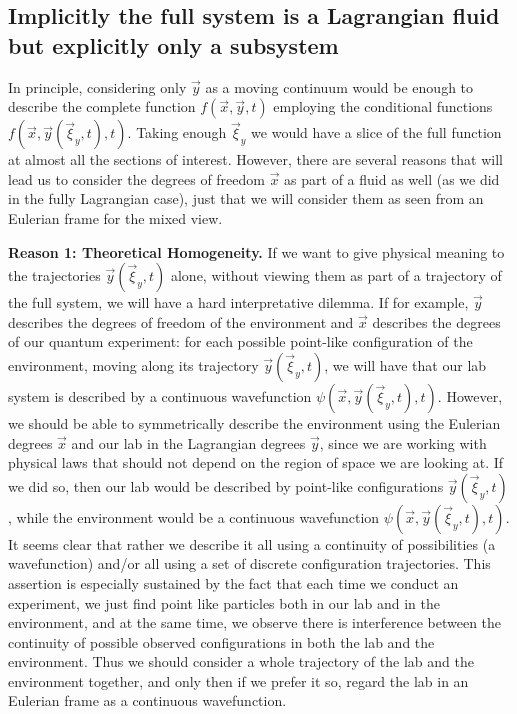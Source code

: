 \documentclass[11pt, a4paper]{article} %
\begin{document}
\subsection*{Implicitly the full system is a Lagrangian fluid but explicitly only a subsystem\vspace{-0.2cm}}
In principle, considering only $\vec{y}$ as a moving continuum would be enough to describe the complete function $f(\vec{x},\vec{y},t)$ employing the conditional functions $f(\vec{x},\vec{y}(\vec{\xi}_y,t),t)$. Taking enough $\vec{\xi}_y$ we would have a slice of the full function at almost all the sections of interest. However, there are several reasons that will lead us to consider the degrees of freedom $\vec{x}$ as part of a fluid as well (as we did in the fully Lagrangian case), just that we will consider them as seen from an Eulerian frame for the mixed view.

{\bf Reason 1: Theoretical Homogeneity.} If we want to give physical meaning to the trajectories $\vec{y}(\vec{\xi}_y,t)$ alone, without viewing them as part of a trajectory of the full system, we will have a hard interpretative dilemma. If for example, $\vec{y}$ describes the degrees of freedom of the environment and $\vec{x}$ describes the degrees of our quantum experiment: for each possible point-like configuration of the environment, moving along its trajectory $\vec{y}(\vec{\xi}_y,t)$, we will have that our lab system is described by a continuous wavefunction $\psi(\vec{x},\vec{y}(\vec{\xi}_y,t),t)$. However, we should be able to symmetrically describe the environment using the Eulerian degrees $\vec{x}$ and our lab in the Lagrangian degrees $\vec{y}$, since we are working with physical laws that should not depend on the region of space we are looking at. If we did so, then our lab would be described by point-like configurations $\vec{y}(\vec{\xi}_y,t)$, while the environment would be a continuous wavefunction $\psi(\vec{x},\vec{y}(\vec{\xi}_y,t),t)$. It seems clear that rather we describe it all using a continuity of possibilities (a wavefunction) and/or all using a set of discrete configuration trajectories. This assertion is especially sustained by the fact that each time we conduct an experiment, we just find point like particles both in our lab and in the environment, and at the same time, we observe there is interference between the continuity of possible observed configurations in both the lab and the environment. Thus we should consider a whole trajectory of the lab and the environment together, and only then if we prefer it so, regard the lab in an Eulerian frame as a continuous wavefunction.
\end{document}
